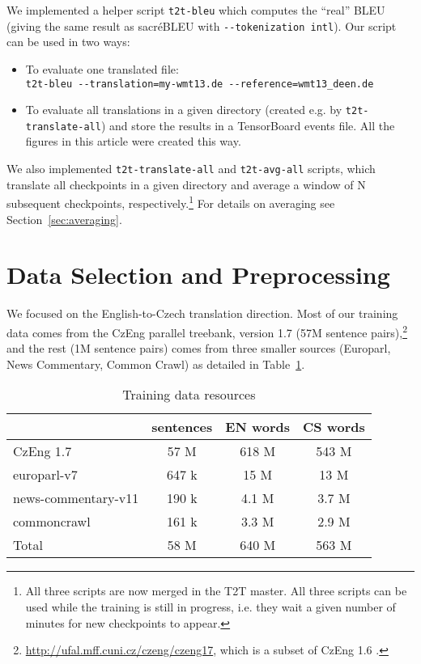 \documentclass{pbmlarxiv} \pdfoutput=1
\def\Sref#1{Section~\ref{#1}}
\def\parcite#1{\cite{#1}}
\begin{document}
We implemented a helper script
\texttt{t2t-bleu} which computes the ``real'' BLEU
 (giving the same result as sacréBLEU with \verb|--tokenization intl|).
Our script can be used in two ways:

\begin{itemize}
\item To evaluate one translated file:\\
   \verb|t2t-bleu --translation=my-wmt13.de --reference=wmt13_deen.de|
\item To evaluate all translations in a given directory
   (created e.g. by \verb|t2t-translate-all|)
   and store the results in a TensorBoard events file.
   All the figures in this article were created this way.
\end{itemize}

We also implemented \verb|t2t-translate-all| and \verb|t2t-avg-all| scripts,
 which translate all checkpoints in a given directory
 and average a window of N subsequent checkpoints, respectively.\footnote{
  All three scripts are now merged in the T2T master.
  All three scripts can be used while the training is still in progress,
  i.e. they wait a given number of minutes for new checkpoints to appear.}
For details on averaging see \Sref{sec:averaging}.

\section{Data Selection and Preprocessing}
\label{sec:data}

We focused on the English-to-Czech translation direction.
Most of our training data comes from the CzEng parallel treebank,
 version 1.7 (57M sentence pairs),\footnote{
  \url{http://ufal.mff.cuni.cz/czeng/czeng17},
  which is a subset of CzEng 1.6 \parcite{czeng16:2016}.
 }
 and the rest (1M sentence pairs) comes from three smaller sources
 (Europarl, News Commentary, Common Crawl)
 as detailed in Table~\ref{tab:data}.

\begin{table}\centering
\begin{tabular}{lccc}
                    & sentences & EN words & CS words \\\hline
CzEng 1.7           & 57 M      & 618 M    & 543 M  \\
europarl-v7         & 647 k     & 15 M     & 13 M   \\
news-commentary-v11 & 190 k     & 4.1 M    & 3.7 M  \\
commoncrawl         & 161 k     & 3.3 M    & 2.9 M  \\\hline
Total               & 58 M      & 640 M    & 563 M  \\\hline
\end{tabular}
\caption{Training data resources}\label{tab:data}
\end{table}
\end{document}
